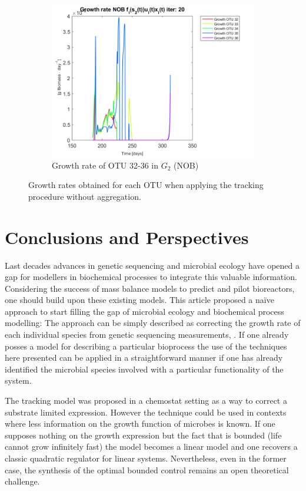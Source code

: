 \documentclass[3p,times]{article}
\begin{document}
\begin{figure}[h]
\begin{subfigure}{0.45 \textwidth}
	\includegraphics[width =\textwidth]{Application//200407_iter_20_growth_control_NOB_plot_1}
	\caption{Growth rate of OTU 32-36 in $G_2$ (NOB) }
	\end{subfigure}
	\caption{Growth rates obtained for each OTU when applying the tracking procedure without aggregation.}
	\label{growth all}
\end{figure}


\clearpage
\section{Conclusions and Perspectives}

Last decades advances in genetic sequencing and microbial ecology have opened a gap for modellers in biochemical processes to integrate this valuable information. Considering the success of mass balance models to predict and pilot bioreactors, one should build upon these existing models. This article proposed a naïve approach to start filling the gap of microbial ecology and biochemical process modelling: The approach can be simply described as correcting the growth rate of each individual species from genetic sequencing measurements, . If one already posses a model for describing a particular bioprocess the use of the techniques here presented can be applied in a straightforward manner if one has already identified the microbial species involved with a particular functionality of the system.

The tracking model was proposed  in a chemostat setting as a way to correct a substrate limited expression. However the technique could be used in contexts where less information on the growth function of microbes is known. If one supposes nothing on the growth expression but the fact that is bounded (life cannot grow infinitely fast) the model becomes a linear model and one recovers a classic quadratic regulator for linear systems. Nevertheless, even in the former case, the synthesis of the optimal bounded control remains an open theoretical challenge.
\end{document}
